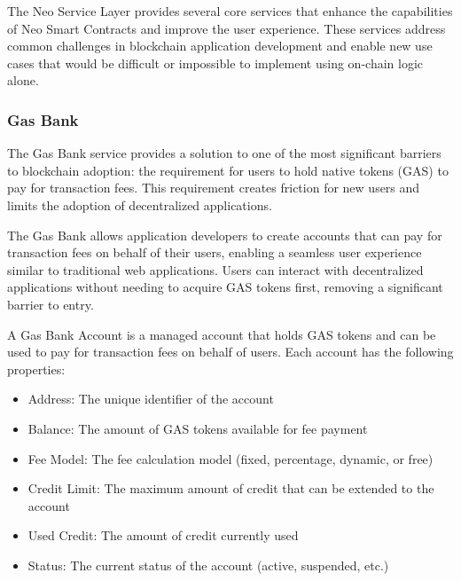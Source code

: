\documentclass[12pt,a4paper]{article}
\begin{document}
The Neo Service Layer provides several core services that enhance the capabilities of Neo Smart Contracts and improve the user experience. These services address common challenges in blockchain application development and enable new use cases that would be difficult or impossible to implement using on-chain logic alone.

\subsubsection{Gas Bank}
\label{subsubsec:gas-bank}

The Gas Bank service provides a solution to one of the most significant barriers to blockchain adoption: the requirement for users to hold native tokens (GAS) to pay for transaction fees. This requirement creates friction for new users and limits the adoption of decentralized applications.



The Gas Bank allows application developers to create accounts that can pay for transaction fees on behalf of their users, enabling a seamless user experience similar to traditional web applications. Users can interact with decentralized applications without needing to acquire GAS tokens first, removing a significant barrier to entry.

\begin{definition}
A Gas Bank Account is a managed account that holds GAS tokens and can be used to pay for transaction fees on behalf of users. Each account has the following properties:
\begin{itemize}
    \item Address: The unique identifier of the account
    \item Balance: The amount of GAS tokens available for fee payment
    \item Fee Model: The fee calculation model (fixed, percentage, dynamic, or free)
    \item Credit Limit: The maximum amount of credit that can be extended to the account
    \item Used Credit: The amount of credit currently used
    \item Status: The current status of the account (active, suspended, etc.)
\end{itemize}
\end{definition}
\end{document}
